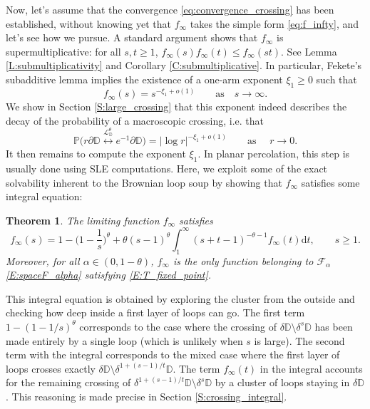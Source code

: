 \documentclass[11pt]{article}
\newtheorem{theorem}{Theorem}[section]
\theoremstyle{remark}
\newcommand{\D}{\mathbb{D}}
\newcommand{\Fc}{\mathcal{F}}
\newcommand{\Lc}{\mathcal{L}}
\renewcommand{\P}{\mathbb{P}}
\renewcommand{\d}{\mathrm{d}}
\numberwithin{equation}{section}
\begin{document}
Now, let's assume that the convergence \eqref{eq:convergence_crossing} has been established, without knowing yet that $f_\infty$ takes the simple form \eqref{eq:f_infty}, and let's see how we pursue.
A standard argument shows that $f_\infty$ is supermultiplicative: for all $s, t \geq 1$, $f_\infty(s) f_\infty(t) \leq f_\infty(st)$. See Lemma \ref{L:submultiplicativity} and Corollary \ref{C:submultiplicative}. In particular, Fekete's subadditive lemma implies the existence of a one-arm exponent $\xi_1 \geq 0$ such that
\begin{equation}
f_\infty(s) = s^{-\xi_1 + o(1)}
\quad \quad \text{as} \quad s \to \infty.
\end{equation}
We show in Section \ref{S:large_crossing} that this exponent indeed describes the decay of the probability of a macroscopic crossing, i.e. that
\[
\P \Big( r \partial \D \overset{\Lc_\D^\theta}{\longleftrightarrow} e^{-1} \partial \D \Big) = |\log r|^{- \xi_1 +o(1)}
\quad \quad \text{as~} \quad r \to 0.
\]
It then remains to compute the exponent $\xi_1$. In planar percolation, this step is usually done using SLE computations. Here, we exploit some of the exact solvability inherent to the Brownian loop soup by showing that $f_\infty$ satisfies some integral equation:

\begin{theorem}\label{T:integral}
The limiting function $f_\infty$ satisfies
\begin{equation}
\label{E:T_fixed_point}
f_\infty(s) = 1 - \Big( 1 - \frac{1}{s} \Big)^\theta + \theta (s-1)^\theta \int_1^\infty (s+t-1)^{-\theta-1} f_\infty(t) \d t,
\quad \quad s \geq 1.
\end{equation}
Moreover, for all $\alpha \in (0,1-\theta)$, $f_\infty$ is the only function belonging to $\Fc_\alpha$ \eqref{E:spaceF_alpha} satisfying \eqref{E:T_fixed_point}.
\end{theorem}

This integral equation is obtained by exploring the cluster from the outside and checking how deep inside a first layer of loops can go. The first term $1 - ( 1 - 1/s )^\theta$ corresponds to the case where the crossing of $\delta \D \setminus \delta^s \D$ has been made entirely by a single loop (which is unlikely when $s$ is large). The second term with the integral corresponds to the mixed case where the first layer of loops crosses exactly $\delta \D \setminus \delta^{1+(s-1)/t} \D$. The term $f_\infty(t)$ in the integral accounts for the remaining crossing of $\delta^{1+(s-1)/t} \D \setminus \delta^s \D$ by a cluster of loops staying in $\delta \D$.
This reasoning is made precise in Section \ref{S:crossing_integral}.
\end{document}
